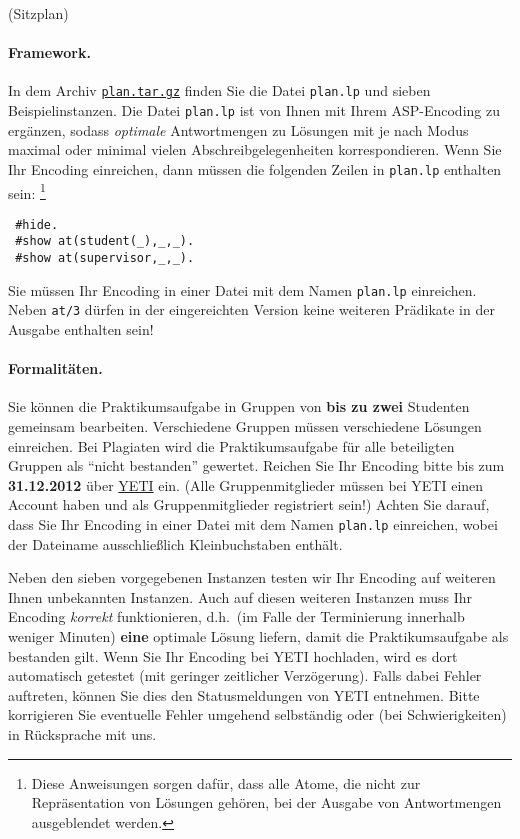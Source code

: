 \documentclass[a4paper,12pt,ngerman]{article}
\begin{document}
\begin{PraktikumsAufgabe}{2}{(Sitzplan)}
\paragraph{Framework.}

\noindent
In dem Archiv \href{http://www.cs.uni-potsdam.de/wv/lehre/12WS/12-Antwortprog/plan.tar.gz}%
{\texttt{plan.tar.gz}} finden Sie die Datei \texttt{plan.lp} und sieben Beispielinstanzen.
Die Datei \texttt{plan.lp} ist von Ihnen mit Ihrem ASP-Encoding zu ergänzen,
sodass \emph{optimale} Antwortmengen zu Lösungen mit je nach Modus
maximal oder minimal vielen Abschreibgelegenheiten
korrespondieren.
Wenn Sie Ihr Encoding einreichen,
dann müssen die folgenden Zeilen in \texttt{plan.lp} enthalten sein:%
\footnote{Diese Anweisungen sorgen dafür, dass alle Atome, die nicht zur Repräsentation von Lösungen gehören, bei der Ausgabe von Antwortmengen ausgeblendet werden.}
\vspace{-1mm}
\begin{verbatim}
 #hide.
 #show at(student(_),_,_).
 #show at(supervisor,_,_).
\end{verbatim}
\vspace{-1mm}
{\small\sf Sie m\"ussen Ihr Encoding in einer Datei mit dem Namen \texttt{plan.lp}
           einreichen.
           Neben \texttt{at/3} d\"urfen in der eingereichten Version keine weiteren
           Pr\"adikate in der Ausgabe enthalten    sein!}%

\paragraph{Formalitäten.}
%
Sie können die Praktikumsaufgabe in Gruppen von \textbf{bis zu zwei} Studenten gemeinsam bearbeiten.
Verschiedene Gruppen müssen verschiedene Lösungen einreichen.
Bei Plagiaten wird die Praktikumsaufgabe für alle beteiligten Gruppen als ``nicht bestanden'' gewertet.
Reichen Sie Ihr Encoding bitte bis zum \textbf{31.12.2012}
über %
\href{http://yeti.haiti.cs.uni-potsdam.de/student/showPractical.do?practicalId=38}{YETI} %
ein.
(Alle Gruppenmitglieder müssen bei YETI einen Account haben und als 
 Gruppenmitglieder registriert sein!)
Achten Sie darauf, dass Sie Ihr Encoding in einer Datei mit dem Namen \texttt{plan.lp} einreichen,
wobei der Dateiname ausschließlich Kleinbuchstaben enthält.

\noindent
Neben den sieben vorgegebenen Instanzen
testen wir Ihr Encoding auf weiteren Ihnen unbekannten Instanzen.
Auch auf diesen weiteren Instanzen muss Ihr Encoding \emph{korrekt} funktionieren,
d.h.\ (im Falle der Terminierung innerhalb weniger Minuten) \textbf{eine} optimale Lösung liefern,
damit die Praktikumsaufgabe als bestanden gilt.
Wenn Sie Ihr Encoding bei YETI hochladen, wird es dort automatisch getestet
(mit geringer zeitlicher Verz\"ogerung).
Falls dabei Fehler auftreten,
k\"onnen Sie dies den Statusmeldungen von YETI entnehmen.
Bitte korrigieren Sie eventuelle Fehler umgehend selbständig oder
(bei Schwierigkeiten) in Rücksprache mit uns.


\end{PraktikumsAufgabe}
\end{document}
